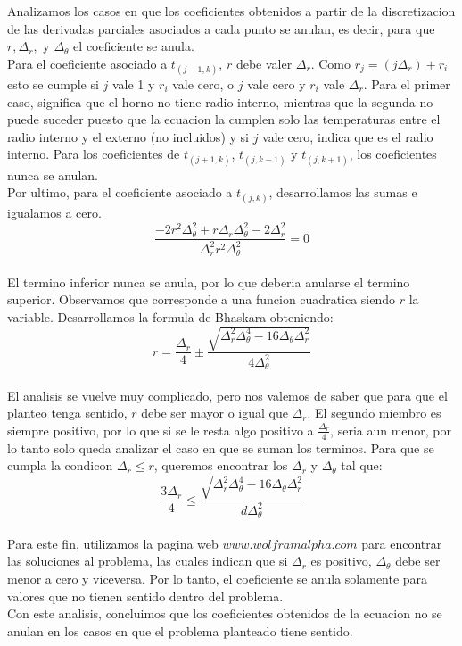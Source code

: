Analizamos los casos en que los coeficientes obtenidos a partir de la discretizacion de las derivadas parciales asociados a cada punto se anulan, es decir, para que $r, \Delta_r,$ y $\Delta_\theta$ el coeficiente se anula. \\
Para el coeficiente asociado a $t_{(j-1, k)}$, $r$ debe valer $\Delta_r$. Como $r_j = (j \Delta_r) + r_i$ esto se cumple si $j$ vale 1 y $r_i$ vale cero, o $j$ vale cero y $r_i$ vale $\Delta_r$. Para el primer caso, significa que el horno no tiene radio interno, mientras que la segunda no puede suceder puesto que la ecuacion la cumplen solo las temperaturas entre el radio interno y el externo (no incluidos) y si $j$ vale cero, indica que es el radio interno.
Para los coeficientes de $t_{(j+1, k)}$, $t_{(j, k-1)}$ y $t_{(j, k+1)}$, los coeficientes nunca se anulan. \\
Por ultimo, para el coeficiente asociado a $t_{(j, k)}$, desarrollamos las sumas e igualamos a cero. \\
$$\frac{-2r^2 \Delta^2_\theta + r \Delta_r \Delta^2_\theta - 2 \Delta^2_r}{\Delta^2_r r^2 \Delta^2_\theta} = 0$$\\
El termino inferior nunca se anula, por lo que deberia anularse el termino superior. Observamos que corresponde a una funcion cuadratica siendo $r$ la variable. Desarrollamos la formula de Bhaskara obteniendo: \\
$$r = \frac{\Delta_r}{4} \pm \frac{\sqrt{\Delta^2_r \Delta^4_\theta - 16 \Delta_\theta \Delta^2_r}}{4 \Delta^2_\theta}$$ \\
El analisis se vuelve muy complicado, pero nos valemos de saber que para que el planteo tenga sentido, $r$ debe ser mayor o igual que $\Delta_r$.
El segundo miembro es siempre positivo, por lo que si se le resta algo positivo a $\frac{\Delta_r}{4}$, seria aun menor, por lo tanto solo queda analizar el caso en que se suman los terminos. Para que se cumpla la condicon $\Delta_r \leq r$, queremos encontrar los $\Delta_r$ y $\Delta_\theta$ tal que: \\
$$\frac{3 \Delta_r}{4}  \leq \frac{\sqrt{\Delta^2_r \Delta^4_\theta - 16 \Delta_\theta \Delta^2_r}}{d \Delta^2_\theta} $$ \\
Para este fin, utilizamos la pagina web $www.wolframalpha.com$ para encontrar las soluciones al problema, las cuales indican que si $\Delta_r$ es positivo, $\Delta_\theta$ debe ser menor a cero y viceversa. Por lo tanto, el coeficiente se anula solamente para valores que no tienen sentido dentro del problema. \\
Con este analisis, concluimos que los coeficientes obtenidos de la ecuacion no se anulan en los casos en que el problema planteado tiene sentido.


